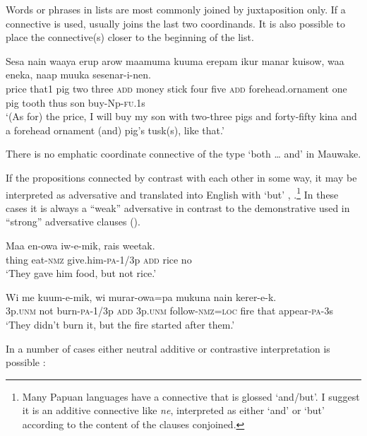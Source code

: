 Words or phrases in lists are most commonly joined by juxtaposition only. If a connective is used,  usually joins the last two  coordinands. It is also possible to place the connective(s) closer to the beginning of the list.

\ea%
\label{ex:3:x1359}
\gll Sesa nain waaya erup arow  maamuma kuuma erepam ikur  manar kuisow, waa eneka, naap muuka sesenar-i-nen.\\
price that1 pig two three \textsc{add} money stick four five \textsc{add} forehead.ornament one pig tooth thus son buy-Np-\textsc{fu}.1s\\
\glt`(As for) the price, I will buy my son with two-three pigs and forty-fifty kina and a forehead ornament (and) pig's tusk(s), like that.'
\z

There is no emphatic coordinate connective of the type `both {\dots} and' in Mauwake. 

If the propositions connected by  contrast with each other in some way, it may be interpreted as adversative and translated into English with `but'  ,  .\footnote{Many Papuan languages have a connective that is glossed `and/but'. I suggest it is an additive connective like \textit{ne}, interpreted as either `and' or `but' according to the content of the clauses conjoined.} In these cases it is always a ``weak'' adversative in contrast to the demonstrative  used in ``strong'' adversative clauses ().

\ea%
\label{ex:3:x715}
\gll Maa en-owa iw-e-mik,  rais weetak. \\
thing eat-\textsc{nmz} give.him-\textsc{pa}-1/3p \textsc{add} rice no\\
\glt`They gave him food, but not rice.'
\z

\ea%
\label{ex:3:x716}
\gll Wi me kuum-e-mik,  wi murar-owa=pa mukuna nain kerer-e-k. \\
3p.\textsc{unm} not burn-\textsc{pa}-1/3p \textsc{add} 3p.\textsc{unm} follow-\textsc{nmz}=\textsc{loc} fire that appear-\textsc{pa}-3s\\
\glt`They didn't burn it, but the fire started after them.'
\z

In a number of cases either neutral additive or contrastive interpretation is possible  :

